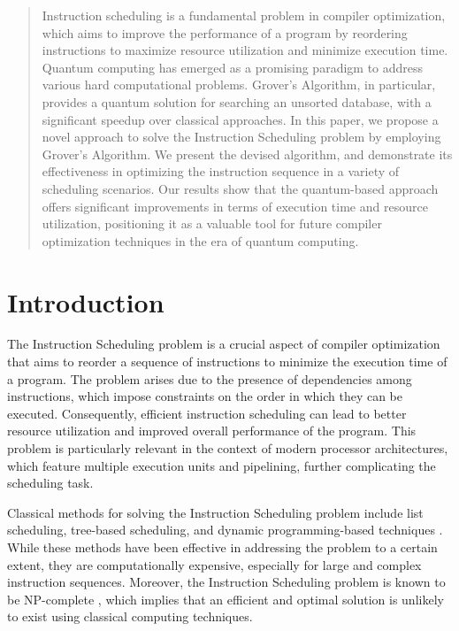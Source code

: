 \begin{abstract}
Instruction scheduling is a fundamental problem in compiler optimization, which aims to improve the performance of a program by reordering instructions to maximize resource utilization and minimize execution time. Quantum computing has emerged as a promising paradigm to address various hard computational problems. Grover's Algorithm, in particular, provides a quantum solution for searching an unsorted database, with a significant speedup over classical approaches. In this paper, we propose a novel approach to solve the Instruction Scheduling problem by employing Grover's Algorithm. We present the devised algorithm, and demonstrate its effectiveness in optimizing the instruction sequence in a variety of scheduling scenarios. Our results show that the quantum-based approach offers significant improvements in terms of execution time and resource utilization, positioning it as a valuable tool for future compiler optimization techniques in the era of quantum computing.
\end{abstract}

\section{Introduction}
The Instruction Scheduling problem is a crucial aspect of compiler optimization that aims to reorder a sequence of instructions to minimize the execution time of a program. The problem arises due to the presence of dependencies among instructions, which impose constraints on the order in which they can be executed. Consequently, efficient instruction scheduling can lead to better resource utilization and improved overall performance of the program. This problem is particularly relevant in the context of modern processor architectures, which feature multiple execution units and pipelining, further complicating the scheduling task.

Classical methods for solving the Instruction Scheduling problem include list scheduling, tree-based scheduling, and dynamic programming-based techniques \cite{garey1979complexity, smith1984instruction}. While these methods have been effective in addressing the problem to a certain extent, they are computationally expensive, especially for large and complex instruction sequences. Moreover, the Instruction Scheduling problem is known to be NP-complete \cite{ungerer1991instruction}, which implies that an efficient and optimal solution is unlikely to exist using classical computing techniques.

